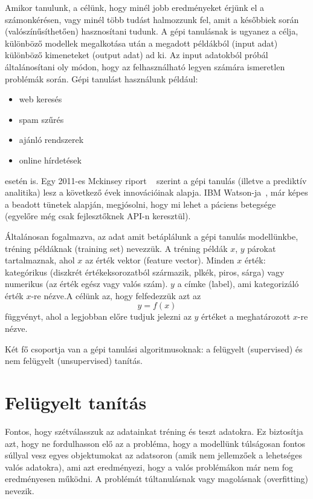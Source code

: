 \documentclass[a4paper,12pt]{article}
\begin{document}
Amikor tanulunk, a célünk, hogy minél jobb eredményeket érjünk el a számonkérésen, vagy minél több tudást halmozzunk fel, amit a későbbiek során (valószínűsíthetően) hasznosítani tudunk. A gépi tanulásnak is ugyanez a célja, különböző modellek megalkotása után a megadott példákból (input adat) különböző kimeneteket (output adat) ad ki. Az input adatokból próbál általánosítani oly módon, hogy az felhasználható legyen számára ismeretlen problémák során. Gépi tanulást használunk például: 
\begin{itemize}
\item web keresés
\item spam szűrés
\item ajánló rendszerek
\item online hírdetések
\end{itemize}
esetén is. 
Egy 2011-es Mckinsey riport ~\cite{mckinsey} szerint a gépi tanulás (illetve a prediktív analitika) lesz a következő évek innovációinak alapja. IBM Watson-ja~\cite{watson}, már képes a beadott tünetek alapján, megjósolni, hogy mi lehet a páciens betegsége (egyelőre még csak fejlesztőknek API-n keresztül). \linebreak

Általánosan fogalmazva, az adat amit betáplálunk a gépi tanulás modellünkbe, tréning példáknak (training set) nevezzük. A tréning példák $x$, $y$ párokat tartalmaznak, ahol $x$ az érték vektor (feature vector). Minden $x$ érték: kategórikus (diszkrét értékeksorozatból származik, pl{kék, piros, sárga}) vagy numerikus (az érték egész vagy valós szám). $y$ a címke (label), ami kategorizáló érték $x$-re nézve.A célünk az, hogy felfedezzük azt az 
\begin{equation*} y=f(x)
\end{equation*}
függvényt, ahol a legjobban előre tudjuk jelezni az $y$ értéket a meghatározott $x$-re nézve.

Két fő csoportja van a gépi tanulási algoritmusoknak: a felügyelt (supervised) és nem felügyelt (unsupervised) tanítás.

\section{Felügyelt tanítás}
Fontos, hogy szétválasszuk az adatainkat tréning és teszt adatokra. Ez biztosítja azt, hogy ne fordulhasson elő az a probléma, hogy a modellünk túlságosan fontos súllyal vesz egyes objektumokat az adatsoron (amik nem jellemzőek a lehetséges valós adatokra), ami azt eredményezi, hogy a valós problémákon már nem fog eredményesen működni. A problémát túltanulásnak vagy magolásnak (overfitting) nevezik.
\end{document}
